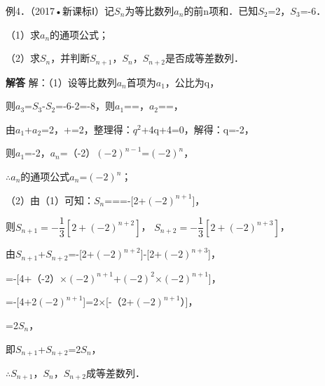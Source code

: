 例4．（2017•新课标Ⅰ）记\ensuremath{S_{n}}为等比数列{\ensuremath{a_{n}}}的前n项和．已知\ensuremath{S_{2}}=2，\ensuremath{S_{3}}=-6．\par
（1）求{\ensuremath{a_{n}}}的通项公式；\par
（2）求\ensuremath{S_{n}}，并判断\ensuremath{S_{n+1}}，\ensuremath{S_{n}}，\ensuremath{S_{n+2}}是否成等差数列．\par
\QuestionSpace{4.8cm}
\ifshowanswers
\par\begingroup\color{solutioncolor}\noindent\textbf{解答}\quad
解：（1）设等比数列{\ensuremath{a_{n}}}首项为\ensuremath{a_{1}}，公比为q，\par
则\ensuremath{a_{3}}=\ensuremath{S_{3}}-\ensuremath{S_{2}}=-6-2=-8，则\ensuremath{a_{1}}==，\ensuremath{a_{2}}==，\par
由\ensuremath{a_{1}}+\ensuremath{a_{2}}=2，+=2，整理得：\ensuremath{q^{2}}+4q+4=0，解得：q=-2，\par
则\ensuremath{a_{1}}=-2，\ensuremath{a_{n}}=（-2）\ensuremath{(-2)^{n-1}}=\ensuremath{(-2)^{n}}，\par
\ensuremath{\therefore}{\ensuremath{a_{n}}}的通项公式\ensuremath{a_{n}}=\ensuremath{(-2)^{n}}；\par
（2）由（1）可知：\ensuremath{S_{n}}===-[2+\ensuremath{(-2)^{n+1}}]，\par
则$S_{n+1}=-\dfrac13[2+(-2)^{n+2}]$，
$S_{n+2}=-\dfrac13[2+(-2)^{n+3}]$，\par
由\ensuremath{S_{n+1}}+\ensuremath{S_{n+2}}=-[2+\ensuremath{(-2)^{n+2}}]-[2+\ensuremath{(-2)^{n+3}}]，\par
=-[4+（-2）\ensuremath{\times}\ensuremath{(-2)^{n+1}}+\ensuremath{(-2)^{2}}\ensuremath{\times}\ensuremath{(-2)^{n+1}}]，\par
=-[4+2\ensuremath{(-2)^{n+1}}]=2\ensuremath{\times}[-（2+\ensuremath{(-2)^{n+1}}）]，\par
=2\ensuremath{S_{n}}，\par
即\ensuremath{S_{n+1}}+\ensuremath{S_{n+2}}=2\ensuremath{S_{n}}，\par
\ensuremath{\therefore}\ensuremath{S_{n+1}}，\ensuremath{S_{n}}，\ensuremath{S_{n+2}}成等差数列．\par
\par\endgroup\fi

